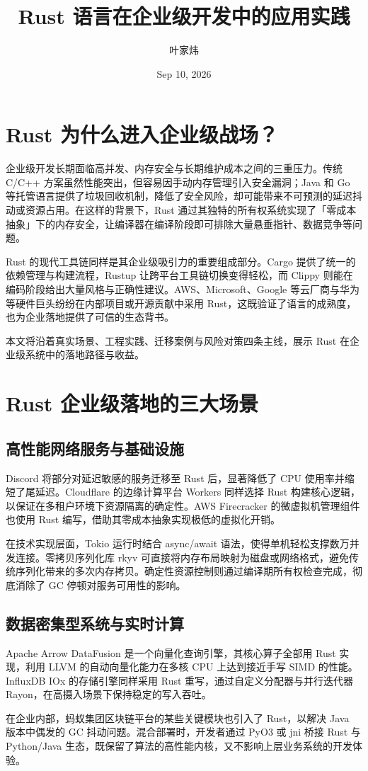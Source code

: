 \title{Rust 语言在企业级开发中的应用实践}
\author{叶家炜}
\date{Sep 10, 2026}
\maketitle
\chapter{Rust 为什么进入企业级战场？}
企业级开发长期面临高并发、内存安全与长期维护成本之间的三重压力。传统 C/C++ 方案虽然性能突出，但容易因手动内存管理引入安全漏洞；Java 和 Go 等托管语言提供了垃圾回收机制，降低了安全风险，却可能带来不可预测的延迟抖动或资源占用。在这样的背景下，Rust 通过其独特的所有权系统实现了「零成本抽象」下的内存安全，让编译器在编译阶段即可排除大量悬垂指针、数据竞争等问题。\par
Rust 的现代工具链同样是其企业级吸引力的重要组成部分。Cargo 提供了统一的依赖管理与构建流程，Rustup 让跨平台工具链切换变得轻松，而 Clippy 则能在编码阶段给出大量风格与正确性建议。AWS、Microsoft、Google 等云厂商与华为等硬件巨头纷纷在内部项目或开源贡献中采用 Rust，这既验证了语言的成熟度，也为企业落地提供了可信的生态背书。\par
本文将沿着真实场景、工程实践、迁移案例与风险对策四条主线，展示 Rust 在企业级系统中的落地路径与收益。\par
\chapter{Rust 企业级落地的三大场景}
\section{高性能网络服务与基础设施}
Discord 将部分对延迟敏感的服务迁移至 Rust 后，显著降低了 CPU 使用率并缩短了尾延迟。Cloudflare 的边缘计算平台 Workers 同样选择 Rust 构建核心逻辑，以保证在多租户环境下资源隔离的确定性。AWS Firecracker 的微虚拟机管理组件也使用 Rust 编写，借助其零成本抽象实现极低的虚拟化开销。\par
在技术实现层面，Tokio 运行时结合 async/await 语法，使得单机轻松支撑数万并发连接。零拷贝序列化库 rkyv 可直接将内存布局映射为磁盘或网络格式，避免传统序列化带来的多次内存拷贝。确定性资源控制则通过编译期所有权检查完成，彻底消除了 GC 停顿对服务可用性的影响。\par
\section{数据密集型系统与实时计算}
Apache Arrow DataFusion 是一个向量化查询引擎，其核心算子全部用 Rust 实现，利用 LLVM 的自动向量化能力在多核 CPU 上达到接近手写 SIMD 的性能。InfluxDB IOx 的存储引擎同样采用 Rust 重写，通过自定义分配器与并行迭代器 Rayon，在高摄入场景下保持稳定的写入吞吐。\par
在企业内部，蚂蚁集团区块链平台的某些关键模块也引入了 Rust，以解决 Java 版本中偶发的 GC 抖动问题。混合部署时，开发者通过 PyO3 或 jni 桥接 Rust 与 Python/Java 生态，既保留了算法的高性能内核，又不影响上层业务系统的开发体验。\par
